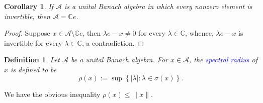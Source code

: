 \documentclass[12pt]{article}
\theoremstyle{thmstyle}
\theoremstyle{defstyle}
\newtheorem{definition}[theorem]{Definition}
\newtheorem*{corollary}{Corollary}
\newcommand{\bbC}{\mathbb{C}}
\newcommand{\calA}{\mathcal{A}} %
\newcommand{\define}[1]{\textcolor{blue}{\textit{#1}}}
\renewcommand{\le}{\leqslant}
\begin{document}
\begin{corollary}
    If $\calA$ is a unital Banach algebra in which every nonzero element is invertible, then $\calA = \bbC e$.
\end{corollary}
\begin{proof}
    Suppose $x\in\calA\setminus\bbC e$, then $\lambda e - x\ne 0$ for every $\lambda\in\bbC$, whence, $\lambda e - x$ is invertible for every $\lambda\in\bbC$, a contradiction.
\end{proof}

\begin{definition}
    Let $\calA$ be a unital Banach algebra. For $x\in\calA$, the \define{spectral radius} of $x$ is defined to be 
    \begin{equation*}
        \rho(x) := \sup\left\{|\lambda|\colon\lambda\in\sigma(x)\right\}.
    \end{equation*}
\end{definition}
We have the obvious inequality $\rho(x)\le\|x\|$.
\end{document}
